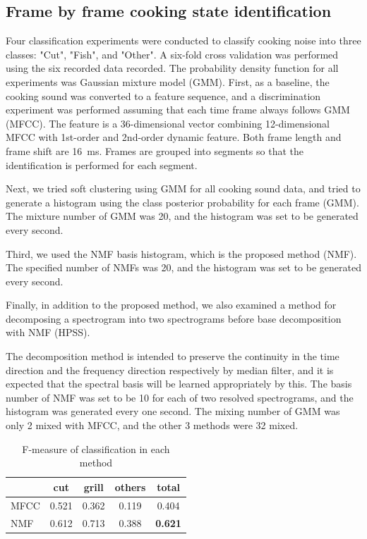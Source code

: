 \documentclass[sigchi]{acmart}
\begin{document}
\subsection{Frame by frame cooking state identification}
Four classification experiments were conducted to classify cooking noise into three classes: "Cut", "Fish", and "Other". A six-fold cross validation was performed using the six recorded data recorded. The probability density function for all experiments was Gaussian mixture model (GMM).
First, as a baseline, the cooking sound was converted to a feature sequence, and a discrimination experiment was performed assuming that each time frame always follows GMM (MFCC).
The feature is a 36-dimensional vector combining 12-dimensional MFCC with 1st-order and 2nd-order dynamic feature. Both frame length and frame shift are \SI{16}{ms}. Frames are grouped into segments so that the identification is performed for each segment.

Next, we tried soft clustering using GMM for all cooking sound data, and tried to generate a histogram using the class posterior probability for each frame (GMM). The mixture number of GMM was 20, and the histogram was set to be generated every second.

Third, we used the NMF basis histogram, which is the proposed method (NMF). The specified number of NMFs was 20, and the histogram was set to be generated every second.

Finally, in addition to the proposed method, we also examined a method for decomposing a spectrogram into two spectrograms before base decomposition with NMF (HPSS).

The decomposition method is intended to preserve the continuity in the time direction and the frequency direction respectively by median filter, and it is expected that the spectral basis will be learned appropriately by this.
The basis number of NMF was set to be 10 for each of two resolved spectrograms, and the histogram was generated every one second.
The mixing number of GMM was only 2 mixed with MFCC, and the other 3 methods were 32 mixed.

\begin{table}[t]
\centering
\caption{F-measure of classification in each method}
\vspace{5pt}
\label{result}
\begin{tabular}{l|ccc|c}
\hline
\hline
          & cut   & grill & others & total \\ \hline
MFCC      & 0.521 & 0.362 & 0.119  & 0.404 \\ %
NMF       & 0.612 & 0.713 & 0.388  & {\bf 0.621} \\ \hline \hline
\end{tabular}
\end{table}
\end{document}
